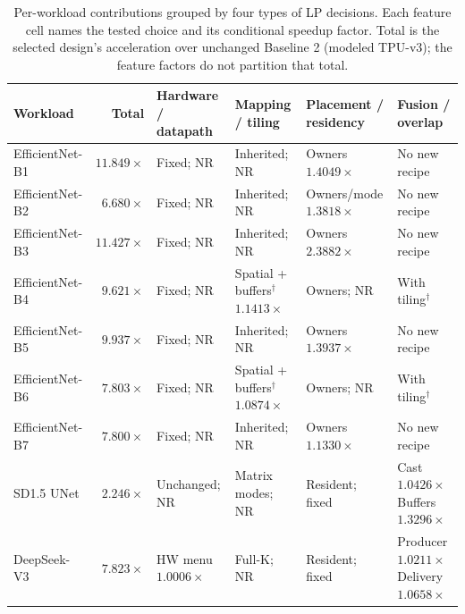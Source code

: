 \begin{table}[H]
\centering\footnotesize
\setlength{\tabcolsep}{3pt}
\renewcommand{\arraystretch}{1.12}
\caption{Per-workload contributions grouped by four types of LP decisions.
Each feature cell names the tested choice and its conditional speedup factor.
Total is the selected design's acceleration over unchanged Baseline 2
(modeled TPU-v3); the feature factors do not partition that total.}
\label{tab:figure3_breakdown}
\begin{tabularx}{\linewidth}{@{}l r *{4}{>{\raggedright\arraybackslash}X}@{}}
\toprule
Workload & Total & Hardware / datapath & Mapping / tiling & Placement / residency & Fusion / overlap \\
\midrule
EfficientNet-B1 & $11.849\times$ & Fixed; NR & Inherited; NR & \shortstack[l]{Owners\\$1.4049\times$} & No new recipe \\
EfficientNet-B2 & $6.680\times$ & Fixed; NR & Inherited; NR & \shortstack[l]{Owners/mode\\$1.3818\times$} & No new recipe \\
EfficientNet-B3 & $11.427\times$ & Fixed; NR & Inherited; NR & \shortstack[l]{Owners\\$2.3882\times$} & No new recipe \\
EfficientNet-B4 & $9.621\times$ & Fixed; NR & \shortstack[l]{Spatial + buffers$^\dagger$\\ $1.1413\times$} & Owners; NR & With tiling$^\dagger$ \\
EfficientNet-B5 & $9.937\times$ & Fixed; NR & Inherited; NR & \shortstack[l]{Owners\\$1.3937\times$} & No new recipe \\
EfficientNet-B6 & $7.803\times$ & Fixed; NR & \shortstack[l]{Spatial + buffers$^\dagger$\\ $1.0874\times$} & Owners; NR & With tiling$^\dagger$ \\
EfficientNet-B7 & $7.800\times$ & Fixed; NR & Inherited; NR & \shortstack[l]{Owners\\$1.1330\times$} & No new recipe \\
SD1.5 UNet & $2.246\times$ & Unchanged; NR & Matrix modes; NR & Resident; fixed & \shortstack[l]{Cast $1.0426\times$\\Buffers $1.3296\times$} \\
DeepSeek-V3 & $7.823\times$ & \shortstack[l]{HW menu\\$1.0006\times$} & Full-K; NR & Resident; fixed & \shortstack[l]{Producer $1.0211\times$\\Delivery $1.0658\times$} \\

\end{tabularx}
\end{table}
